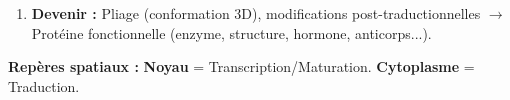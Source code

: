 \documentclass[11pt]{article}
\begin{document}
\begin{methode}
\begin{enumerate}
\begin{itemize}
\begin{enumerate}
                        \item \textbf{Termination :} Codon STOP (UAA, UAG, UGA) reconnu par facteur de libération $\rightarrow$ Hydrolyse liaison peptidyl-ARNt $\rightarrow$ Libération polypeptide + dissociation ribosome.
                    \end{enumerate}
            \end{itemize}
        \item \textbf{Devenir :} Pliage (conformation 3D), modifications post-traductionnelles $\rightarrow$ Protéine fonctionnelle (enzyme, structure, hormone, anticorps...).
    \end{enumerate}
    \textbf{Repères spatiaux :} \textbf{Noyau} = Transcription/Maturation. \textbf{Cytoplasme} = Traduction.
\end{methode}
\end{document}
